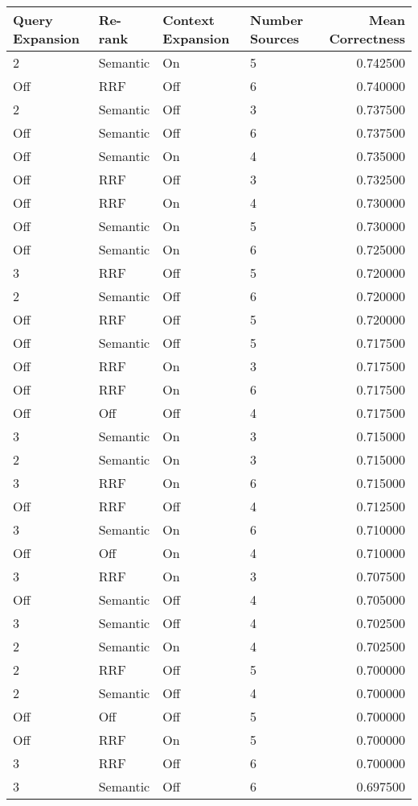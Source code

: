 \begin{tabular}{llllr}
\toprule
Query Expansion & Re-rank & Context Expansion & Number Sources & Mean Correctness \\
\midrule
2 & Semantic & On & 5 & 0.742500 \\
Off & RRF & Off & 6 & 0.740000 \\
2 & Semantic & Off & 3 & 0.737500 \\
Off & Semantic & Off & 6 & 0.737500 \\
Off & Semantic & On & 4 & 0.735000 \\
Off & RRF & Off & 3 & 0.732500 \\
Off & RRF & On & 4 & 0.730000 \\
Off & Semantic & On & 5 & 0.730000 \\
Off & Semantic & On & 6 & 0.725000 \\
3 & RRF & Off & 5 & 0.720000 \\
2 & Semantic & Off & 6 & 0.720000 \\
Off & RRF & Off & 5 & 0.720000 \\
Off & Semantic & Off & 5 & 0.717500 \\
Off & RRF & On & 3 & 0.717500 \\
Off & RRF & On & 6 & 0.717500 \\
Off & Off & Off & 4 & 0.717500 \\
3 & Semantic & On & 3 & 0.715000 \\
2 & Semantic & On & 3 & 0.715000 \\
3 & RRF & On & 6 & 0.715000 \\
Off & RRF & Off & 4 & 0.712500 \\
3 & Semantic & On & 6 & 0.710000 \\
Off & Off & On & 4 & 0.710000 \\
3 & RRF & On & 3 & 0.707500 \\
Off & Semantic & Off & 4 & 0.705000 \\
3 & Semantic & Off & 4 & 0.702500 \\
2 & Semantic & On & 4 & 0.702500 \\
2 & RRF & Off & 5 & 0.700000 \\
2 & Semantic & Off & 4 & 0.700000 \\
Off & Off & Off & 5 & 0.700000 \\
Off & RRF & On & 5 & 0.700000 \\
3 & RRF & Off & 6 & 0.700000 \\
3 & Semantic & Off & 6 & 0.697500 \\

\end{tabular}
